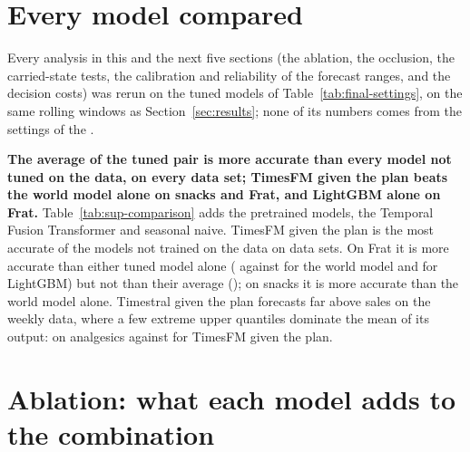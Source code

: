 \section{Every model compared}

\label{sec:sup-comparison}
Every analysis in this and the next five sections (the ablation, the occlusion,
the carried-state tests, the calibration and reliability of the forecast ranges,
and the decision costs) was rerun on the tuned models of
Table~\ref{tab:final-settings}, on the same rolling windows as
Section~\ref{sec:results}; none of its numbers comes from the settings of the
\firstver{}.


\textbf{The average of the tuned pair is more accurate than every model not
tuned on the data, on every data set; TimesFM given the plan beats the world
model alone on snacks and Frat, and LightGBM alone on Frat.} Table~\ref{tab:sup-comparison}
adds the pretrained models, the Temporal Fusion Transformer and seasonal naive.
TimesFM given the plan is the most accurate of the models not trained on the
data on \supTfmPlanBestUntrained{} data sets. On Frat it is more accurate than
either tuned model alone (\supFratTfmPlan{} against \supFratWm{} for the world
model and \supFratLgb{} for LightGBM) but not than their average
(\supFratAvg{}); on snacks it is more accurate than the world model alone. Timestral given the plan forecasts far above sales on the
weekly data, where a few extreme upper quantiles dominate the mean of its
output: \supAnaTstPlan{} on analgesics against \supAnaTfmPlan{} for TimesFM given
the plan.



\secbarrier
\section{Ablation: what each model adds to the combination}
\label{sec:sup-ablation}

